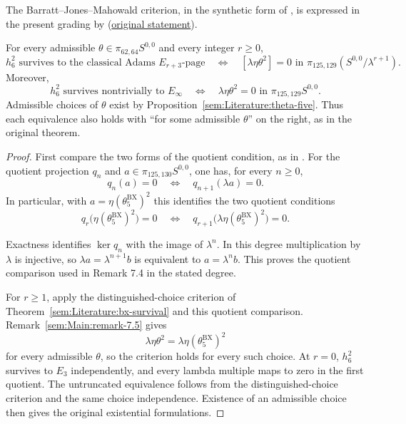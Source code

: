 \begin{theorem}
\label{paper:7.3}
\label{sem:Main:any-choice-criterion}
\label{thm:bjmbx}
The Barratt--Jones--Mahowald criterion, in the synthetic form of
\cite[Proposition 7.19]{BurklundXu}, is expressed in the present grading
by \cite[Theorem 7.3 and Remarks 7.4--7.5]{LWX126}
(\href{paper/main.tex.html#L2117}{original statement}).

For every admissible $\theta\in\pi_{62,64}S^{0,0}$ and every integer
$r\geq0$,
\[
 h_6^2\text{ survives to the classical Adams }E_{r+3}\text{-page}
 \quad\Longleftrightarrow\quad
 [\lambda\eta\theta^2]=0\text{ in }\pi_{125,129}(S^{0,0}/\lambda^{r+1}).
\]
Moreover,
\[
 h_6^2\text{ survives nontrivially to }E_\infty
 \quad\Longleftrightarrow\quad\lambda\eta\theta^2=0
 \text{ in }\pi_{125,129}S^{0,0}.
\]
Admissible choices of $\theta$ exist by
Proposition~\ref{sem:Literature:theta-five}. Thus each equivalence also
holds with ``for some admissible $\theta$'' on the right, as in the
original theorem.
\end{theorem}
\begin{proof}
First compare the two forms of the quotient condition, as in
\cite[Remark 7.4]{LWX126}. For the quotient projection $q_n$ and
$a\in\pi_{125,130}S^{0,0}$, one has, for every $n\geq0$,
\[
 q_n(a)=0\quad\Longleftrightarrow\quad q_{n+1}(\lambda a)=0.
\]
In particular, with $a=\eta(\theta_5^{\mathrm{BX}})^2$ this identifies the two quotient conditions
\[
 q_r\bigl(\eta(\theta_5^{\mathrm{BX}})^2\bigr)=0
 \quad\Longleftrightarrow\quad
 q_{r+1}\bigl(\lambda\eta(\theta_5^{\mathrm{BX}})^2\bigr)=0.
\]

Exactness identifies $\ker q_n$ with the image of $\lambda^n$. In this degree multiplication by $\lambda$ is injective, so $\lambda a=\lambda^{n+1}b$ is equivalent to $a=\lambda^n b$. This proves the quotient comparison used in Remark 7.4 in the stated degree.

For $r\geq1$, apply the distinguished-choice criterion of
Theorem~\ref{sem:Literature:bx-survival} and this quotient comparison.
Remark~\ref{sem:Main:remark-7.5} gives
\[
 \lambda\eta\theta^2=\lambda\eta(\theta_5^{\mathrm{BX}})^2
\]
for every admissible $\theta$, so the criterion holds for every such
choice. At $r=0$, $h_6^2$ survives to $E_3$ independently, and every
lambda multiple maps to zero in the first quotient. The untruncated
equivalence follows from the distinguished-choice criterion and the
same choice independence. Existence of an admissible choice then gives
the original existential formulations.
\end{proof}

